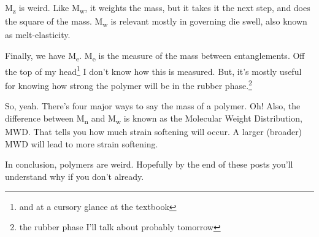 \documentclass[12pt]{article}[titlepage]
\newcommand{\1}{\={a}}
\newcommand{\2}{\={e}}
\newcommand{\3}{\={\i}}
\newcommand{\4}{\=o}
\newcommand{\5}{\=u}
\newcommand{\6}{\={A}}
\newcommand{\sub}[1]{\textsubscript{#1}}
\renewcommand{\,}{\textsuperscript{,}}
\begin{document}
M\sub{z} is weird.
Like M\sub{w}, it weights the mass, but it takes it the next step, and does the square of the mass.
M\sub{w} is relevant mostly in governing die swell, also known as melt-elasticity.

Finally, we have M\sub{e}.
M\sub{e} is the measure of the mass between entanglements.
Off the top of my head\footnote{and at a cursory glance at the textbook} I don't know how this is measured.
But, it's mostly useful for knowing how strong the polymer will be in the rubber phase.\footnote{the rubber phase I'll talk about probably tomorrow}

So, yeah.
There's four major ways to say the mass of a polymer.
Oh! 
Also, the difference between M\sub{n} and M\sub{w} is known as the Molecular Weight Distribution, MWD.
That tells you how much strain softening will occur.
A larger (broader) MWD will lead to more strain softening.

In conclusion, polymers are weird.
Hopefully by the end of these posts you'll understand why if you don't already.
\end{document}
